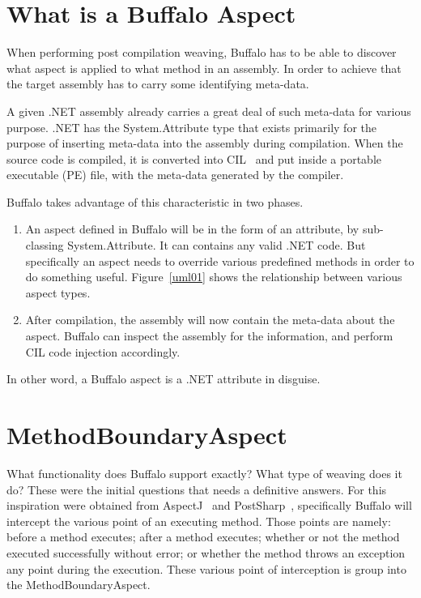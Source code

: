 \section{What is a Buffalo Aspect}

When performing post compilation weaving, Buffalo has to be able to discover what aspect is applied to what method in an assembly. In order to achieve that the target assembly has to carry some identifying meta-data.

A given .NET assembly already carries a great deal of such meta-data for various purpose. .NET has the System.Attribute type that exists primarily for the purpose of inserting meta-data into the assembly during compilation. When the source code is compiled, it is converted into CIL~\cite{msil_text} and put inside a portable executable (PE) file, with the meta-data generated by the compiler. 

Buffalo takes advantage of this characteristic in two phases.
\begin{enumerate}
	\item An aspect defined in Buffalo will be in the form of an attribute, by sub-classing System.Attribute. It can contains any valid .NET code. But specifically an aspect needs to override various predefined methods in order to do something useful. Figure~\ref{uml01} shows the relationship between various aspect types.
	\item After compilation, the assembly will now contain the meta-data about the aspect. Buffalo can inspect the assembly for the information, and perform CIL code injection accordingly.
\end{enumerate}

In other word, a Buffalo aspect is a .NET attribute in disguise.

\section{MethodBoundaryAspect}
What functionality does Buffalo support exactly? What type of weaving does it do? These were the initial questions that needs a definitive answers. For this inspiration were obtained from AspectJ~\cite{aspectj_faq} and PostSharp~\cite{postsharp}, specifically Buffalo will intercept the various point of an executing method. Those points are namely: before a method executes; after a method executes; whether or not the method executed successfully without error; or whether the method throws an exception any point during the execution. These various point of interception is group into the MethodBoundaryAspect.

